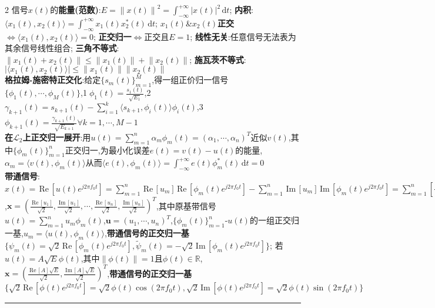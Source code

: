 \documentclass[UTF8,a4paper,10pt]{article}
\providecommand{\abs}[1]{\left\lvert#1\right\rvert}
\providecommand{\norm}[1]{\left\lVert#1\right\rVert}
\providecommand{\re}{\,\mathrm{Re}\,}
\providecommand{\im}{\,\mathrm{Im}\,}
\begin{document}
\begin{multicols*}{2}
信号$x(t)$的\textbf{能量(范数)}:$E=\norm{x(t)}^2=\int_{-\infty}^{+\infty}\abs{x(t)}^2\,\mathrm{d}t$;%
    \textbf{内积}:$\langle x_1(t),x_2(t)\rangle=\int_{-\infty}^{+\infty}x_1(t)x_2^*(t)\,\mathrm{d}t$;%
    $x_1(t)$\&$x_2(t)$\textbf{正交}$\Leftrightarrow\langle x_1(t),x_2(t)\rangle=0$;%
    \textbf{正交归一}$\Leftrightarrow$正交且$E=1$;%
    \textbf{线性无关}:任意信号无法表为其余信号线性组合;%
    \textbf{三角不等式}:$\norm{x_1(t)+x_2(t)}\leq\norm{x_1(t)}+\norm{x_2(t)}$;%
    \textbf{施瓦茨不等式}:$\abs{\langle x_1(t),x_2(t)\rangle}\leq\norm{x_1(t)}\norm{x_2(t)}$\\
\textbf{格拉姆-施密特正交化}:给定$\{s_m(t)\}_{m=1}^M$,得一组正价归一信号$\{\phi_1(t),\cdots,\phi_M(t)\}$,\textcircled{1}$\phi_1(t)=\frac{s_1(t)}{\sqrt{E_1}}$,\textcircled{2}$\gamma_{k+1}(t)=s_{k+1}(t)-\sum_{i=1}^k\langle s_{k+1},\phi_i(t)\rangle\phi_i(t)$,\textcircled{3}$\phi_{k+1}(t)=\frac{\gamma_{k+1}(t)}{\sqrt{E_{k+1}}}\forall k=1,\cdots,M-1$\\
\textbf{在$\mathcal{L}_2$上正交归一展开}:用$u(t)=\sum_{m=1}^n\alpha_m\phi_m(t)=(\alpha_1,\cdots,\alpha_n)^T$近似$v(t)$,其中$\{\phi_m(t)\}_{m=1}^n$正交归一,为最小化误差$e(t)=v(t)-u(t)$的能量,$\alpha_m=\langle v(t),\phi_m(t)\rangle$从而$\langle e(t),\phi_m(t)\rangle=\int_{-\infty}^{+\infty}e(t)\phi_m^*(t)\,\mathrm{d}t=0$\\
\textbf{带通信号}:$x(t)=\re[u(t)e^{j2\pi f_0t}]=\sum_{m=1}^n\re[u_m]\re[\phi_m(t)e^{j2\pi f_0t}]-\sum_{m=1}^n\im[u_m]\im[\phi_m(t)e^{j2\pi f_0t}]=\sum_{m=1}^n[\frac{\re[u_m]}{\sqrt{2}}\psi_m(t)+\frac{\im[u_m]}{\sqrt{2}}\tilde{\psi}_m(t)]$,$\bm{x}=(\frac{\re[u_1]}{\sqrt{2}},\frac{\im[u_1]}{\sqrt{2}},\cdots,\frac{\re[u_n]}{\sqrt{2}},\frac{\im[u_n]}{\sqrt{2}})^T$,其中原基带信号$u(t)=\sum_{m=1}^nu_m\phi_m(t)$,$\bm{u}=(u_1,\cdots,u_n)^T$,$\{\phi_m(t)\}_{m=1}^n$-$u(t)$的一组正交归一基,$u_m=\langle u(t),\phi_m(t)\rangle$,\textbf{带通信号的正交归一基}$\{\psi_m(t)=\sqrt{2}\re[\phi_m(t)e^{j2\pi f_0t}],\tilde{\psi}_m(t)=-\sqrt{2}\im[\phi_m(t)e^{j2\pi f_0t}]\}$;
    若$u(t)=A\sqrt{E}\phi(t)$,其中$\norm{\phi(t)}=1$且$\phi(t)\in\mathbb{R}$,$\bm{x}=(\frac{\re[A]\sqrt{E}}{\sqrt{2}},\frac{\im[A]\sqrt{E}}{\sqrt{2}})^T$,\textbf{带通信号的正交归一基}$\{\sqrt{2}\re[\phi(t)e^{j2\pi f_0t}]=\sqrt{2}\phi(t)\cos(2\pi f_0t),\sqrt{2}\im[\phi(t)e^{j2\pi f_0t}]=\sqrt{2}\phi(t)\sin(2\pi f_0t)\}$\\
\rule{\columnwidth}{.2pt}\\
\\
\end{multicols*}
\end{document}
